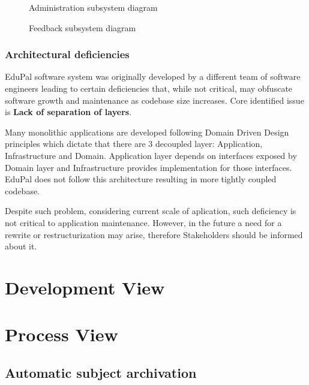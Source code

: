\documentclass[
    english, %
]{VUMIFPSkursinis}
\begin{document}
\begin{figure}[ht]
    \centering
    
    \caption{Administration subsystem diagram}
    \label{administration-model}
\end{figure}

\begin{figure}[ht]
    \centering
    
    \caption{Feedback subsystem diagram}
    \label{feedback-model}
\end{figure}

\subsubsection{Architectural deficiencies}

EduPal software system was originally developed by a different team of software engineers leading to certain deficiencies that, while not critical, may obfuscate software growth and maintenance as codebase size increases. Core identified issue is \textbf{Lack of separation of layers}.

Many monolithic applications are developed following Domain Driven Design principles which dictate that there are 3 decoupled layer: Application, Infrastructure and Domain. Application layer depends on interfaces exposed by Domain layer and Infrastructure provides implementation for those interfaces. EduPal does not follow this architecture resulting in more tightly coupled codebase.

Despite such problem, considering current scale of aplication, such deficiency is not critical to application maintenance. However, in the future a need for a rewrite or restructurization may arise, therefore Stakeholders should be informed about it.

\section{Development View}

\section{Process View}

\subsection{Automatic subject archivation}
\end{document}
